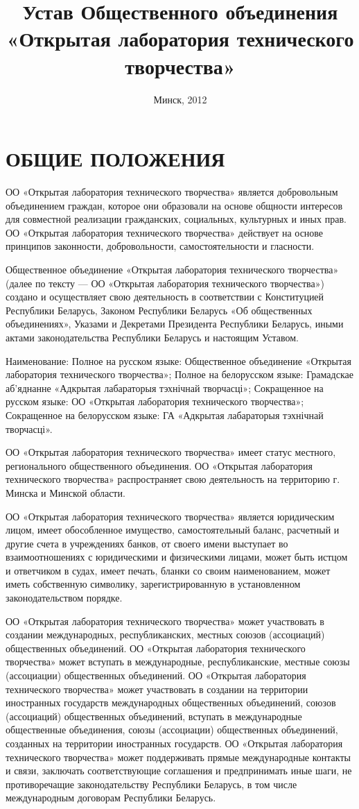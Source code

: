 \documentclass[a4paper,14pt,titlepage]{extarticle}
\date{Минск, 2012}
\title{Устав Общественного объединения «Открытая лаборатория технического творчества»}
\begin{document}
\section{ОБЩИЕ ПОЛОЖЕНИЯ}

ОО «Открытая лаборатория технического творчества» является добровольным объединением граждан, которое они образовали на
основе общности интересов для совместной реализации гражданских, социальных, культурных и иных прав. ОО «Открытая
лаборатория технического творчества» действует на основе принципов законности, добровольности, самостоятельности и
гласности.

Общественное объединение «Открытая лаборатория технического творчества» (далее по тексту — ОО «Открытая лаборатория
технического творчества») создано и осуществляет свою деятельность в соответствии с Конституцией Республики Беларусь,
Законом Республики Беларусь «Об общественных объединениях», Указами и Декретами Президента Республики Беларусь, иными
актами законодательства Республики Беларусь и настоящим Уставом.

Наименование:
Полное на русском языке: Общественное объединение «Открытая лаборатория технического творчества»;
Полное на белорусском языке: Грамадскае аб’яднанне «Адкрытая лабараторыя тэхнічнай творчасці»;
Сокращенное на русском языке: ОО «Открытая лаборатория технического творчества»;
Сокращенное на белорусском языке: ГА «Адкрытая лабараторыя тэхнічнай творчасці».

ОО «Открытая лаборатория технического творчества» имеет статус местного, регионального общественного объединения. ОО
«Открытая лаборатория технического творчества» распространяет свою деятельность на территорию г. Минска и Минской
области.

ОО «Открытая лаборатория технического творчества» является юридическим лицом, имеет обособленное имущество,
самостоятельный баланс, расчетный и другие счета в учреждениях банков, от своего имени выступает во взаимоотношениях с
юридическими и физическими лицами, может быть истцом и ответчиком в судах, имеет печать, бланки со своим наименованием,
может иметь собственную символику, зарегистрированную в установленном законодательством порядке.

 ОО «Открытая лаборатория технического творчества» может участвовать в создании международных, республиканских, местных
союзов (ассоциаций) общественных объединений. ОО «Открытая лаборатория технического творчества» может вступать в
международные, республиканские, местные союзы (ассоциации) общественных объединений. ОО «Открытая лаборатория
технического творчества» может участвовать в создании на территории иностранных государств международных общественных
объединений, союзов (ассоциаций) общественных объединений, вступать в международные общественные объединения, союзы
(ассоциации) общественных объединений, созданных на территории иностранных государств. ОО «Открытая лаборатория
технического творчества» может поддерживать прямые международные контакты и связи, заключать соответствующие соглашения
и предпринимать иные шаги, не противоречащие законодательству Республики Беларусь, в том числе международным договорам
Республики Беларусь.
\end{document}
